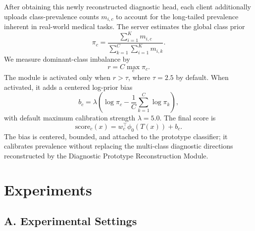 \documentclass[letterpaper]{article} %
\begin{document}
After obtaining this newly reconstructed diagnostic head, each client additionally uploads class-prevalence counts $m_{i,c}$ to account for the long-tailed prevalence inherent in real-world medical tasks. The server estimates the global class prior
\begin{equation}
\pi_c=\frac{\sum_{i=1}^{K}m_{i,c}}{\sum_{k=1}^{C}\sum_{i=1}^{K}m_{i,k}}.
\end{equation}
We measure dominant-class imbalance by
\begin{equation}
r=C\max_c \pi_c.
\end{equation}
The module is activated only when $r>\tau$, where $\tau=2.5$ by default. When activated, it adds a centered log-prior bias
\begin{equation}
b_c=\lambda\left(\log\pi_c-\frac{1}{C}\sum_{k=1}^{C}\log\pi_k\right),
\end{equation}
with default maximum calibration strength $\lambda=5.0$. The final score is
\begin{equation}
\mathrm{score}_c(x)=w_c^\top\phi_0(T(x))+b_c.
\end{equation}
The bias is centered, bounded, and attached to the prototype classifier; it calibrates prevalence without replacing the multi-class diagnostic directions reconstructed by the Diagnostic Prototype Reconstruction Module.

\section{Experiments}

\subsection{A. Experimental Settings}
\end{document}
